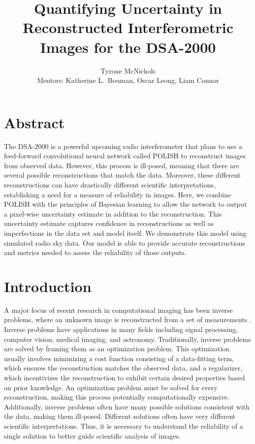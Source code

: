 \documentclass{article}
\title{Quantifying Uncertainty in Reconstructed Interferometric Images for the DSA-2000}
\author{Tyrone McNichols\\ Mentors: Katherine L.\ Bouman, Oscar Leong, Liam Connor}
\date{}
\begin{document}
\maketitle


\section{Abstract}
The DSA-2000 is a powerful upcoming radio interferometer that plans to use a feed-forward convolutional neural network called POLISH to reconstruct images from observed data. However, this process is ill-posed, meaning that there are several possible reconstructions that match the data. Moreover, these different reconstructions can have drastically different scientific interpretations, establishing a need for a measure of reliability in images. Here, we combine POLISH with the principles of Bayesian learning to allow the network to output a pixel-wise uncertainty estimate in addition to the reconstruction. This uncertainty estimate captures confidence in reconstructions as well as imperfections in the data set and model itself. We demonstrate this model using simulated radio sky data. Our model is able to provide accurate reconstructions and metrics needed to assess the reliability of those outputs. 


\section{Introduction}

A major focus of recent research in computational imaging has been inverse problems, where an unknown image is reconstructed from a set of measurements \cite{POGGIO1987638}. Inverse problems have applications in many fields including signal processing, computer vision, medical imaging, and astronomy. Traditionally, inverse problems are solved by framing them as an optimization problem. This optimization usually involves minimizing a cost function consisting of a data-fitting term, which ensures the reconstruction matches the observed data, and a regularizer, which incentivizes the reconstruction to exhibit certain desired properties based on prior knowledge. An optimization problem must be solved for every reconstruction, making this process potentially computationally expensive. Additionally, inverse problems often have many possible solutions consistent with the data, making them ill-posed. Different solutions often have very different scientific interpretations. Thus, it is necessary to understand the reliability of a single solution to better guide scientific analysis of images.
\end{document}
